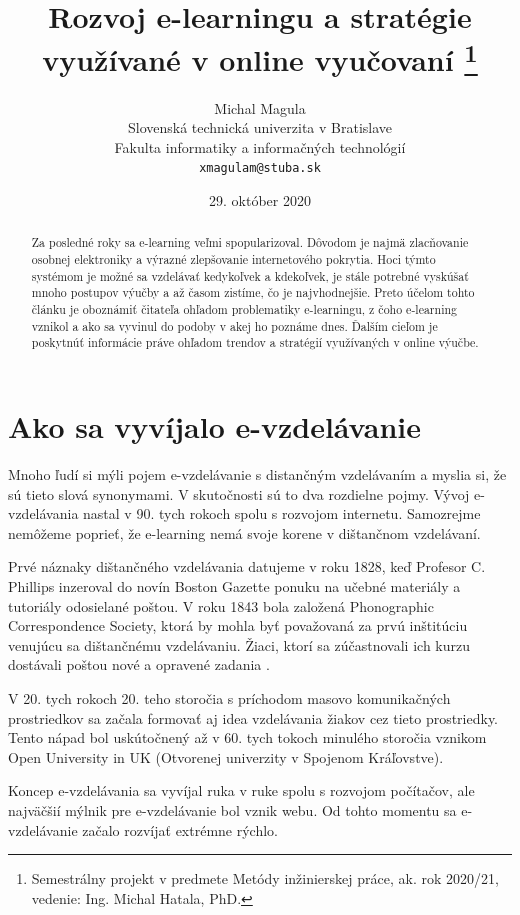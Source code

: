 \documentclass[10pt,slovak,a4paper]{article}
\title
{
	Rozvoj e-learningu a stratégie využívané v online vyučovaní
	\thanks
	{
		Semestrálny projekt v predmete Metódy inžinierskej práce, ak. rok 2020/21, vedenie: Ing. Michal Hatala, PhD.
	}
} %
\author{Michal Magula\\[2pt]
	{\small Slovenská technická univerzita v Bratislave}\\
	{\small Fakulta informatiky a informačných technológií}\\
	{\small \texttt{xmagulam@stuba.sk}}
	}
\date{\small 29. október 2020}
\begin{document}
\maketitle

\begin{abstract}
	Za posledné roky sa e-learning veľmi spopularizoval. Dôvodom je najmä zlacňovanie osobnej elektroniky a výrazné zlepšovanie internetového pokrytia. Hoci týmto systémom je možné sa vzdelávať kedykoľvek a kdekoľvek, je stále potrebné vyskúšať mnoho postupov výučby a až časom zistíme, čo je najvhodnejšie. Preto účelom tohto článku je oboznámiť čitateľa ohľadom problematiky e-learningu, z čoho e-learning vznikol a ako sa vyvinul do podoby v akej ho poznáme dnes. Ďalším cieľom je poskytnúť informácie práve ohľadom trendov a stratégií využívaných v online výučbe.
\end{abstract}

\section{Ako sa vyvíjalo e-vzdelávanie} \label{Evolution}

	Mnoho ľudí si mýli pojem e-vzdelávanie s distančným vzdelávaním a myslia si, že sú tieto slová synonymami.
	V skutočnosti sú to dva rozdielne pojmy. Vývoj e-vzdelávania nastal v 90. tych rokoch spolu s rozvojom internetu.
	Samozrejme nemôžeme poprieť, že e-learning nemá svoje korene v dištančnom vzdelávaní.\cite{main}

	Prvé náznaky dištančného vzdelávania datujeme v roku 1828, keď Profesor C. Phillips inzeroval do novín
	Boston Gazette ponuku na učebné materiály a tutoriály odosielané poštou. V roku 1843 bola 
	založená Phonographic Correspondence Society, ktorá by mohla byť považovaná za prvú inštitúciu 
	venujúcu sa dištančnému vzdelávaniu. Žiaci, ktorí sa zúčastnovali ich kurzu dostávali poštou
	nové a opravené zadania \cite{main}.

	V 20. tych rokoch 20. teho storočia s príchodom masovo komunikačných prostriedkov sa začala formovať aj idea
	vzdelávania žiakov cez tieto prostriedky. Tento nápad bol uskútočnený až v 60. tych tokoch minulého storočia 
	vznikom Open University in UK (Otvorenej univerzity v Spojenom Kráľovstve).\cite{main}

	Koncep e-vzdelávania sa vyvíjal ruka v ruke spolu s rozvojom počítačov, ale 
	najväčšií mýlnik pre e-vzdelávanie bol vznik webu. Od tohto momentu sa 
	e-vzdelávanie začalo rozvíjať extrémne rýchlo.\cite{main}
\end{document}

